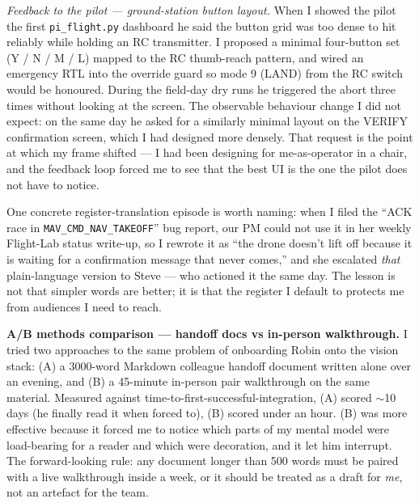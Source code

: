 \textit{Feedback to the pilot --- ground-station button layout.} When I showed the pilot the first \texttt{pi\_flight.py} dashboard he said the button grid was too dense to hit reliably while holding an RC transmitter. I proposed a minimal four-button set (Y / N / M / L) mapped to the RC thumb-reach pattern, and wired an emergency RTL into the override guard so mode 9 (LAND) from the RC switch would be honoured. During the field-day dry runs he triggered the abort three times without looking at the screen. The observable behaviour change I did not expect: on the same day he asked for a similarly minimal layout on the VERIFY confirmation screen, which I had designed more densely. That request is the point at which my frame shifted --- I had been designing for me-as-operator in a chair, and the feedback loop forced me to see that the best UI is the one the pilot does not have to notice.

One concrete register-translation episode is worth naming: when I filed the ``ACK race in \texttt{MAV\_CMD\_NAV\_TAKEOFF}'' bug report, our PM could not use it in her weekly Flight-Lab status write-up, so I rewrote it as ``the drone doesn't lift off because it is waiting for a confirmation message that never comes,'' and she escalated \emph{that} plain-language version to Steve --- who actioned it the same day. The lesson is not that simpler words are better; it is that the register I default to protects me from audiences I need to reach.

\textbf{A/B methods comparison --- handoff docs vs in-person walkthrough.} I tried two approaches to the same problem of onboarding Robin onto the vision stack: (A) a 3000-word Markdown colleague handoff document written alone over an evening, and (B) a 45-minute in-person pair walkthrough on the same material. Measured against time-to-first-successful-integration, (A) scored $\sim$10 days (he finally read it when forced to), (B) scored under an hour. (B) was more effective because it forced me to notice which parts of my mental model were load-bearing for a reader and which were decoration, and it let him interrupt. The forward-looking rule: any document longer than 500 words must be paired with a live walkthrough inside a week, or it should be treated as a draft for \emph{me}, not an artefact for the team.

